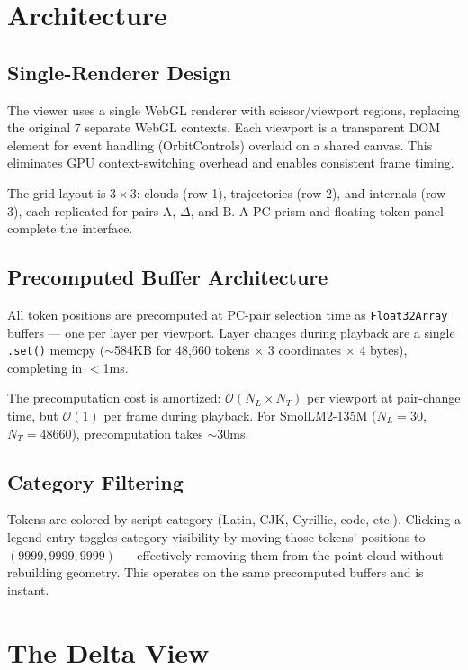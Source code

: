 \documentclass[11pt,a4paper]{article}
\begin{document}
\section{Architecture}

\subsection{Single-Renderer Design}

The viewer uses a single WebGL renderer with scissor/viewport regions, replacing the original 7 separate WebGL contexts. Each viewport is a transparent DOM element for event handling (OrbitControls) overlaid on a shared canvas. This eliminates GPU context-switching overhead and enables consistent frame timing.

The grid layout is $3 \times 3$: clouds (row 1), trajectories (row 2), and internals (row 3), each replicated for pairs A, $\Delta$, and B. A PC prism and floating token panel complete the interface.

\subsection{Precomputed Buffer Architecture}

All token positions are precomputed at PC-pair selection time as \texttt{Float32Array} buffers — one per layer per viewport. Layer changes during playback are a single \texttt{.set()} memcpy ($\sim$584KB for 48,660 tokens $\times$ 3 coordinates $\times$ 4 bytes), completing in $<$1ms.

The precomputation cost is amortized: $\mathcal{O}(N_L \times N_T)$ per viewport at pair-change time, but $\mathcal{O}(1)$ per frame during playback. For SmolLM2-135M ($N_L=30$, $N_T=48660$), precomputation takes $\sim$30ms.

\subsection{Category Filtering}

Tokens are colored by script category (Latin, CJK, Cyrillic, code, etc.). Clicking a legend entry toggles category visibility by moving those tokens' positions to $(9999, 9999, 9999)$ — effectively removing them from the point cloud without rebuilding geometry. This operates on the same precomputed buffers and is instant.

\section{The Delta View}
\end{document}
